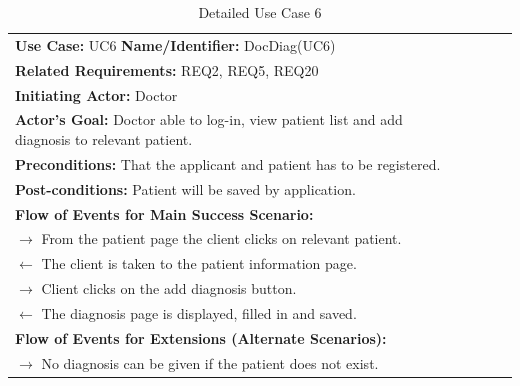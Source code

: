 \documentclass[a4paper]{article}
\begin{document}
\FloatBarrier

\begin{table}[h!]
\centering
\caption*{Detailed Use Case 6}
\label{DetailedUC2}
\begin{tabular}{|c|llll}
\cline{1-1}

\multicolumn{1}{|l|}{\textbf{Use Case:} UC6 \textbf{Name/Identifier:} DocDiag(UC6)} &  &  &  &  \\ \cline{1-1}

\multicolumn{1}{|l|}{\textbf{Related Requirements:} REQ2, REQ5, REQ20} &  &  &  &  \\

\multicolumn{1}{|l|}{\textbf{Initiating Actor:} Doctor} &  &  &  &  \\

\multicolumn{1}{|l|}{\textbf{Actor’s Goal:} Doctor able to log-in, view patient list and add diagnosis to relevant patient.} &  &  &  &  \\

\multicolumn{1}{|l|}{\textbf{Preconditions:} That the applicant and patient has to be registered.} &  &  &  &  \\

\multicolumn{1}{|l|}{\textbf{Post-conditions:} Patient will be saved by application.} &  &  &  &  \\

\multicolumn{1}{|l|}{\textbf{Flow of Events for Main Success Scenario:}} &  &  &  &  \\

\multicolumn{1}{|l|}{ $ \rightarrow $ From the patient page the client clicks on relevant patient.} &  &  &  &  \\

\multicolumn{1}{|l|}{ $ \leftarrow $ The client is taken to the patient information page.} &  &  &  &  \\

\multicolumn{1}{|l|}{ $ \rightarrow $ Client clicks on the add diagnosis button.} &  &  &  &  \\

\multicolumn{1}{|l|}{ $ \leftarrow $ The diagnosis page is displayed, filled in and saved.} &  &  &  &  \\

\multicolumn{1}{|l|}{\textbf{Flow of Events for Extensions (Alternate Scenarios):}} &  &  &  &  \\

\multicolumn{1}{|l|}{ $ \rightarrow $ No diagnosis can be given if the patient does not exist.} &  &  &  &  \\ \cline{1-1}

\end{tabular}
\end{table}
\end{document}
